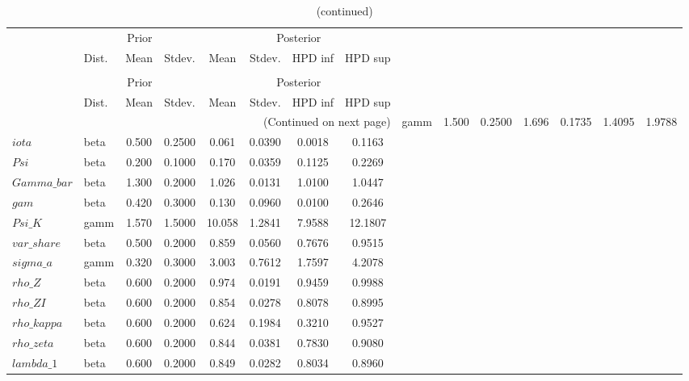  
\begin{center}
\begin{longtable}{llcccccc} 
\caption{Results from Metropolis-Hastings (parameters)}
 \label{Table:MHPosterior:1}\\
\toprule 
  & \multicolumn{3}{c}{Prior}  &  \multicolumn{4}{c}{Posterior} \\
  \cmidrule(r{.75em}){2-4} \cmidrule(r{.75em}){5-8}
  & Dist. & Mean  & Stdev. & Mean & Stdev. & HPD inf & HPD sup\\
\midrule \endfirsthead 
\caption{(continued)}\\\toprule 
  & \multicolumn{3}{c}{Prior}  &  \multicolumn{4}{c}{Posterior} \\
  \cmidrule(r{.75em}){2-4} \cmidrule(r{.75em}){5-8}
  & Dist. & Mean  & Stdev. & Mean & Stdev. & HPD inf & HPD sup\\
\midrule \endhead 
\bottomrule \multicolumn{8}{r}{(Continued on next page)} \endfoot 
\bottomrule \endlastfoot 
$sigma$ & gamm &   1.500 & 0.2500 &   1.696& 0.1735 &  1.4095 &  1.9788 \\ 
$iota$ & beta &   0.500 & 0.2500 &   0.061& 0.0390 &  0.0018 &  0.1163 \\ 
$Psi$ & beta &   0.200 & 0.1000 &   0.170& 0.0359 &  0.1125 &  0.2269 \\ 
$Gamma\_bar$ & beta &   1.300 & 0.2000 &   1.026& 0.0131 &  1.0100 &  1.0447 \\ 
$gam$ & beta &   0.420 & 0.3000 &   0.130& 0.0960 &  0.0100 &  0.2646 \\ 
$Psi\_K$ & gamm &   1.570 & 1.5000 &  10.058& 1.2841 &  7.9588 & 12.1807 \\ 
$var\_share$ & beta &   0.500 & 0.2000 &   0.859& 0.0560 &  0.7676 &  0.9515 \\ 
$sigma\_a$ & gamm &   0.320 & 0.3000 &   3.003& 0.7612 &  1.7597 &  4.2078 \\ 
$rho\_Z$ & beta &   0.600 & 0.2000 &   0.974& 0.0191 &  0.9459 &  0.9988 \\ 
$rho\_ZI$ & beta &   0.600 & 0.2000 &   0.854& 0.0278 &  0.8078 &  0.8995 \\ 
$rho\_kappa$ & beta &   0.600 & 0.2000 &   0.624& 0.1984 &  0.3210 &  0.9527 \\ 
$rho\_zeta$ & beta &   0.600 & 0.2000 &   0.844& 0.0381 &  0.7830 &  0.9080 \\ 
$lambda\_1$ & beta &   0.600 & 0.2000 &   0.849& 0.0282 &  0.8034 &  0.8960 \\ 
\end{longtable}
 \end{center}

